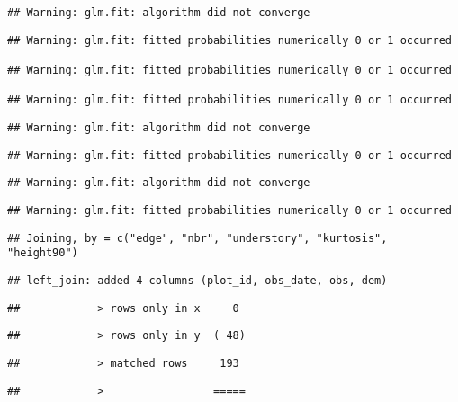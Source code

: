 \documentclass[
]{article}
\begin{document}
\begin{verbatim}
## Warning: glm.fit: algorithm did not converge
\end{verbatim}

\begin{verbatim}
## Warning: glm.fit: fitted probabilities numerically 0 or 1 occurred

## Warning: glm.fit: fitted probabilities numerically 0 or 1 occurred

## Warning: glm.fit: fitted probabilities numerically 0 or 1 occurred
\end{verbatim}

\begin{verbatim}
## Warning: glm.fit: algorithm did not converge
\end{verbatim}

\begin{verbatim}
## Warning: glm.fit: fitted probabilities numerically 0 or 1 occurred
\end{verbatim}

\begin{verbatim}
## Warning: glm.fit: algorithm did not converge
\end{verbatim}

\begin{verbatim}
## Warning: glm.fit: fitted probabilities numerically 0 or 1 occurred
\end{verbatim}

\begin{verbatim}
## Joining, by = c("edge", "nbr", "understory", "kurtosis", "height90")
\end{verbatim}

\begin{verbatim}
## left_join: added 4 columns (plot_id, obs_date, obs, dem)
\end{verbatim}

\begin{verbatim}
##            > rows only in x     0
\end{verbatim}

\begin{verbatim}
##            > rows only in y  ( 48)
\end{verbatim}

\begin{verbatim}
##            > matched rows     193
\end{verbatim}

\begin{verbatim}
##            >                 =====
\end{verbatim}
\end{document}
